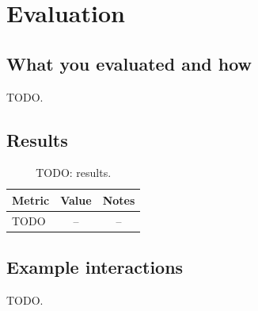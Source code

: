 \section{Evaluation}
\label{sec:eval}


\subsection{What you evaluated and how}
TODO.

\subsection{Results}
\begin{table}[H]
  \centering
  \begin{tabular}{lcc}
    \toprule
    Metric & Value & Notes \\
    \midrule
    TODO & -- & -- \\
    \bottomrule
  \end{tabular}
  \caption{TODO: results.}
  \label{tab:results}
\end{table}

\subsection{Example interactions}
TODO.
